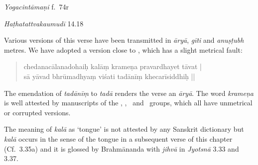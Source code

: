 \begin{ekdosis}
\begin{testimonia}[hp03_033]
\emph{Yogacintāmaṇi} f.~74r
\begin{versinnote}
\end{versinnote}

\emph{Haṭhatattvakaumudī} 14.18
\begin{versinnote}
\end{versinnote}
\end{testimonia}

\begin{philcomm}[hp03_033]

Various versions of this verse have been transmitted in \emph{āryā}, \emph{gīti} and \emph{anuṣṭubh} metres. We have adopted a version close to \alphaTwo, which has a slight metrical fault:
\begin{quote}
 chedanacālanadohaiḥ kalāṃ krameṇa pravardhayet tāvat |\\
 sā yāvad bhrūmadhyaṃ viśati tadānīṃ khecarīsiddhiḥ ||
\end{quote}
The emendation of \emph{tadānīṃ} to \emph{tadā} renders the verse an \emph{āryā}. The word \emph{krameṇa} is well attested by manuscripts of the \textalpha, \textbeta, \texteta\ and  \textepsilon\ groups, which all have unmetrical or corrupted versions. 

The meaning of \emph{kalā} as `tongue' is not attested by any Sanskrit dictionary but \emph{kalā} occurs in the sense of the tongue in a subsequent verse of this chapter (Cf.~3.35a) and it is glossed by Brahmānanda with \emph{jihvā} in \emph{Jyotsnā} 3.33 and 3.37.
%
\end{philcomm}


\end{ekdosis}
